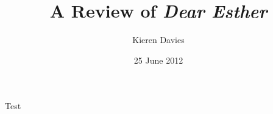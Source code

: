 \documentclass[a4paper]{article}
\begin{document}
\title{A Review of \emph{Dear Esther}}
\author{Kieren Davies}
\date{25 June 2012}
\maketitle
Test
\end{document}
